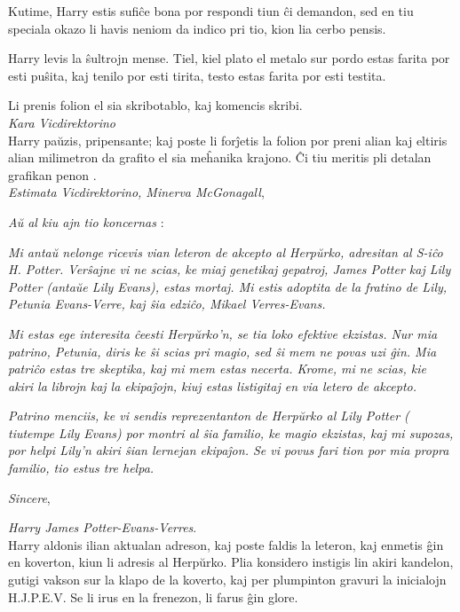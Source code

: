 Kutime, Harry estis sufiĉe bona por respondi tiun ĉi demandon, sed en tiu
speciala okazo li havis neniom da indico pri tio, kion lia cerbo pensis.

Harry levis la ŝultrojn mense. Tiel, kiel plato el metalo sur pordo estas farita
por esti puŝita, kaj tenilo por esti tirita, testo estas farita por esti
testita.

Li prenis folion el sia skribotablo, kaj komencis skribi. \\

\emph{Kara Vicdirektorino} \\

Harry paŭzis, pripensante; kaj poste li forĵetis la folion por preni alian kaj
eltiris alian milimetron da grafito el sia meĥanika krajono. Ĉi tiu meritis pli
detalan grafikan penon . \\

\emph{Estimata Vicdirektorino, Minerva McGonagall},

\emph{Aŭ al kiu ajn tio koncernas} :

\emph{Mi antaŭ nelonge ricevis vian leteron de akcepto al Herpŭrko, adresitan al
S-iĉo H. Potter. Verŝajne vi ne scias, ke miaj genetikaj gepatroj, James Potter
kaj Lily Potter (antaŭe Lily Evans), estas mortaj. Mi estis adoptita de la
fratino de Lily, Petunia Evans-Verre, kaj ŝia edziĉo, Mikael Verres-Evans.}

\emph{Mi estas ege interesita ĉeesti Herpŭrko'n, se tia loko efektive ekzistas.
Nur mia patrino, Petunia, diris ke ŝi scias pri magio, sed ŝi mem ne povas uzi
ĝin. Mia patriĉo estas tre skeptika, kaj mi mem estas necerta. Krome, mi ne
scias, kie akiri la librojn kaj la ekipaĵojn, kiuj estas listigitaj en via
letero de akcepto.}

\emph{Patrino menciis, ke vi sendis reprezentanton de Herpŭrko al Lily Potter (
tiutempe Lily Evans) por montri al ŝia familio, ke magio ekzistas, kaj mi
supozas, por helpi Lily'n akiri ŝian lernejan ekipaĵon. Se vi povus fari tion
por mia propra familio, tio estus tre helpa.}

\emph{Sincere},

\emph{Harry James Potter-Evans-Verres}.\\


Harry aldonis ilian aktualan adreson, kaj poste faldis la leteron, kaj enmetis
ĝin en koverton, kiun li adresis al Herpŭrko. Plia konsidero instigis lin akiri
kandelon, gutigi vakson sur la klapo de la koverto, kaj per plumpinton gravuri
la inicialojn H.J.P.E.V. Se li irus en la frenezon, li farus ĝin glore.

